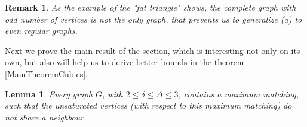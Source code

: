 \documentclass[fleqn,12pt,twoside]{article}
\newtheorem{lemma}{Lemma}
\newtheorem{remark}{Remark}
\begin{document}
\begin{remark}
As the example of the "fat triangle" shows, the complete graph with
odd number of vertices is not the only graph, that prevents us to
generalize (a) to even regular graphs.
\end{remark}

Next we prove the main result of the section, which is interesting
not only on its own, but also will help us to derive better bounds
in the theorem \ref{MainTheoremCubics}.

\begin{lemma}
\label{Max Matching 2-3} Every graph $G$, with $2\leq \delta\leq
\Delta \leq 3$, contains a maximum matching, such that the
unsaturated vertices (with respect to this maximum matching) do not
share a neighbour.
\end{lemma}
\end{document}
